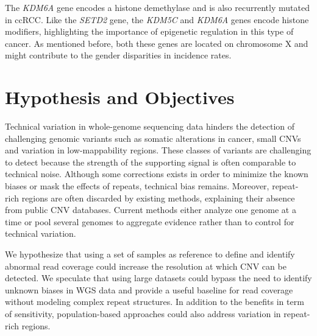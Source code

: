 The {\it KDM6A} gene encodes a histone demethylase and is also recurrently mutated in ccRCC\cite{Dalgliesh2010}.
Like the {\it SETD2} gene, the {\it KDM5C} and {\it KDM6A} genes encode histone modifiers, highlighting the importance of epigenetic regulation in this type of cancer.
As mentioned before, both these genes are located on chromosome X and might contribute to the gender disparities in incidence rates.



\section{Hypothesis and Objectives}

Technical variation in whole-genome sequencing data hinders the detection of challenging genomic variants such as somatic alterations in cancer, small CNVs and variation in low-mappability regions.
These classes of variants are challenging to detect because the strength of the supporting signal is often comparable to technical noise.
Although some corrections exists in order to minimize the known biases or mask the effects of repeats, technical bias remains.
Moreover, repeat-rich regions are often discarded by existing methods, explaining their absence from public CNV databases.
Current methods either analyze one genome at a time or pool several genomes to aggregate evidence rather than to control for technical variation.
\medskip

We hypothesize that using a set of samples as reference to define and identify abnormal read coverage could increase the resolution at which CNV can be detected.
We speculate that using large datasets could bypass the need to identify unknown biases in WGS data and provide a useful baseline for read coverage without modeling complex repeat structures.
In addition to the benefits in term of sensitivity, population-based approaches could also address variation in repeat-rich regions.
\medskip

